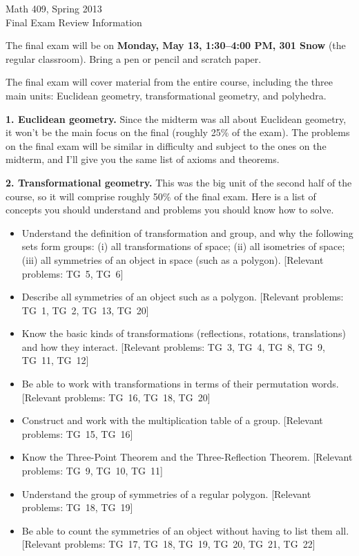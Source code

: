 

\thispagestyle{empty}
\begin{center}\large Math 409, Spring 2013\\
Final Exam Review Information
\end{center}

The final exam will be on \textbf{Monday, May 13, 1:30--4:00 PM, 301 Snow}
(the regular classroom).  Bring a pen or pencil and scratch paper.

The final exam will cover material from the entire course,
including the three main units: Euclidean geometry,
transformational geometry, and polyhedra.

\textbf{1. Euclidean geometry.}  Since the midterm was
all about Euclidean geometry, it won't be the main focus on the final
(roughly 25\% of the exam).
The problems on the final exam will be similar in difficulty
and subject to the ones on the midterm, and I'll give you the same list
of axioms and theorems.

\textbf{2. Transformational geometry.}  This was the big unit
of the second half of the course, so it will comprise roughly
50\% of the final exam.  Here is a list of
concepts you should understand and problems you should know how to solve.

\begin{itemize}

\item Understand the definition of transformation and group, and why the
following sets form groups:
(i) all transformations of space; (ii) all isometries of space;
(iii) all symmetries of an object in space (such as a polygon).
[Relevant problems: TG~5, TG~6]

\item Describe all symmetries of an object such as a polygon.
[Relevant problems: TG~1, TG~2, TG~13, TG~20]

\item Know the basic kinds of transformations (reflections, rotations,
translations) and how they interact.
[Relevant problems: TG~3, TG~4, TG~8, TG~9, TG~11, TG~12]

\item Be able to work with transformations in terms of their permutation words.
[Relevant problems: TG~16, TG~18, TG~20]

\item Construct and work with the multiplication table of a group.
[Relevant problems: TG~15, TG~16]

\item Know the Three-Point Theorem and the Three-Reflection Theorem.
[Relevant problems: TG~9, TG~10, TG~11]

\item Understand the group of symmetries of a regular polygon.
[Relevant problems: TG~18, TG~19]

\item Be able to count the symmetries of an object without having to list them all.
[Relevant problems: TG~17, TG~18, TG~19, TG~20, TG~21, TG~22]
\end{itemize}

